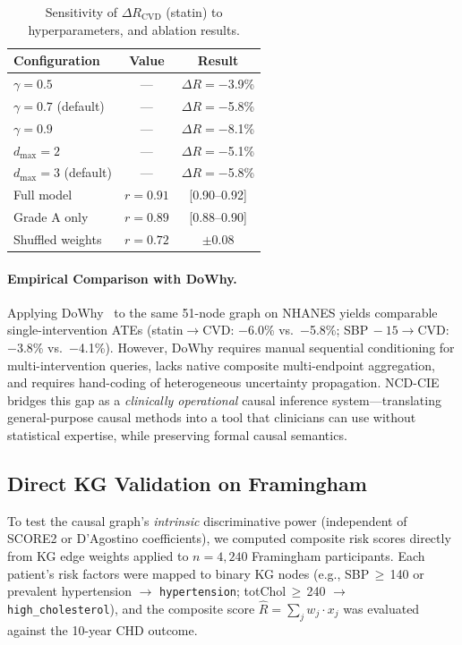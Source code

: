 \documentclass[runningheads]{llncs}
\begin{document}
\renewcommand{\arraystretch}{1.1}
\begin{table}[t]
\centering
\caption{Sensitivity of $\Delta R_{\text{CVD}}$ (statin) to
hyperparameters, and ablation results.}\label{tab:sensitivity}
\small
\begin{tabular}{@{}lcc@{}}
\toprule
\textbf{Configuration} & \textbf{Value} & \textbf{Result} \\
\midrule
$\gamma = 0.5$ & --- & $\Delta R = -$3.9\% \\
$\gamma = 0.7$ (default) & --- & $\Delta R = -$5.8\% \\
$\gamma = 0.9$ & --- & $\Delta R = -$8.1\% \\
$d_{\max} = 2$ & --- & $\Delta R = -$5.1\% \\
$d_{\max} = 3$ (default) & --- & $\Delta R = -$5.8\% \\
\midrule
Full model & $r = 0.91$ & [0.90--0.92] \\
Grade A only & $r = 0.89$ & [0.88--0.90] \\
Shuffled weights & $r = 0.72$ & $\pm 0.08$ \\
\bottomrule
\end{tabular}
\end{table}
\renewcommand{\arraystretch}{1.0}

\paragraph{Empirical Comparison with DoWhy.}
Applying DoWhy~\cite{sharma2020dowhy} to the same 51-node graph on
NHANES yields comparable single-intervention ATEs
(statin$\to$CVD: $-$6.0\% vs.\ $-$5.8\%;
SBP$\,-15\to$CVD: $-$3.8\% vs.\ $-$4.1\%).
However, DoWhy requires manual sequential conditioning for
multi-intervention queries, lacks native composite multi-endpoint
aggregation, and requires hand-coding of heterogeneous uncertainty
propagation.
NCD-CIE bridges this gap as a \emph{clinically operational}
causal inference system---translating general-purpose causal
methods into a tool that clinicians can use without statistical
expertise, while preserving formal causal semantics.

\subsection{Direct KG Validation on Framingham}\label{sec:directkg}

To test the causal graph's \emph{intrinsic} discriminative power
(independent of SCORE2 or D'Agostino coefficients), we computed
composite risk scores directly from KG edge weights applied to
$n = 4{,}240$ Framingham participants.
Each patient's risk factors were mapped to binary KG nodes
(e.g., SBP\,$\geq$\,140 or prevalent hypertension $\to$
\texttt{hypertension}; totChol\,$\geq$\,240 $\to$
\texttt{high\_cholesterol}), and the composite score
$\hat{R} = \sum_j w_j \cdot x_j$ was evaluated against the
10-year CHD outcome.
\end{document}
